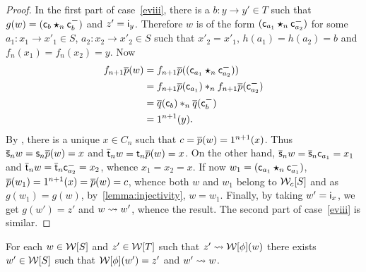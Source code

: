 \begin{proof}
In the first part of
   case~\ref{eviii}, there is a $b:y\to y'\in T$ such that $g(w)=(\mathsf{c}_{b}\bm{\star}_{n}\mathsf{c}^{\boldsymbol{-}}_{b})$ and $z'=\mathsf{i}_{y}$. Therefore $w$ is of the form $(\mathsf{c}_{a_1}\bm{\star}_{n}\mathsf{c}^{\boldsymbol{-}}_{a_2})$ for some $a_1:x_1\to x'_1\in S$,  $a_2:x_2\to x'_2\in
   S$ such that $x'_2=x'_1$, $h(a_1)=h(a_2)=b$ and
   $f_n(x_1)=f_n(x_2)=y$.  Now
   \begin{align*}
     f_{n+1}\overline{p}(w) & = f_{n+1}\overline{p}((\mathsf{c}_{a_1}\bm{\star}_{n}\mathsf{c}^{\boldsymbol{-}}_{a_2}))\\
                                     & = f_{n+1}\overline{p}(\mathsf{c}_{a_1})\ast_{n}
                                       f_{n+1}\overline{p}(\mathsf{c}^{\boldsymbol{-}}_{a_2})\\
                                     & = \overline{q}(\mathsf{c}_{b})\ast_{n}\overline{q}(\mathsf{c}^{\boldsymbol{-}}_{b})\\
                                     & = 1^{n+1}(y).
   \end{align*}
   By  \cndi, there is a unique $x\in C_n$ such that
   $c=\overline{p}(w)=1^{n+1}(x)$. Thus $\overline{\mathsf{s}}_{n}w=\mathsf{s}_{n}\overline{p}(w)=x$
   and $\overline{\mathsf{t}}_{n}w=\mathsf{t}_{n}\overline{p}(w)=x$. On the other hand, $\overline{\mathsf{s}}_{n}w=\overline{\mathsf{s}}_{n} \mathsf{c}_{a_1}=x_1$ and $\overline{\mathsf{t}}_{n}w=\overline{\mathsf{t}}_{n}\mathsf{c}^{\boldsymbol{-}}_{a_2}=x_2$,
   whence $x_1=x_2=x$. If now $w_1=(\mathsf{c}_{a_1}\bm{\star}_{n}\mathsf{c}^{\boldsymbol{-}}_{a_1})$,
   $\overline{p}(w_1)=1^{n+1}(x)=\overline{p}(w)=c$, whence both $w$ and
   $w_1$
   belong to $\mathcal{W}_{c}[S]$ and as 
   $g(w_1)=g(w)$, by~\cref{lemma:injectivity}, $w=w_1$. Finally, by taking
   $w'=\mathsf{i}_{x}$, we get $g(w')=z'$ and $w\leadsto w'$, whence the result.
The second part of case~\ref{eviii} is similar.
 \end{proof}
 \begin{lemma}\label{lemma:backward_lift_frel}
 For each $w\in \mathcal{W}[S]$ and $z'\in\mathcal{W}[T]$ such that $z'\leadsto\mathcal{W}[\phi](w)$ there exists $w'\in\mathcal{W}[S]$ such
 that $\mathcal{W}[\phi](w')=z'$ and $w'\leadsto w$.
\end{lemma}
